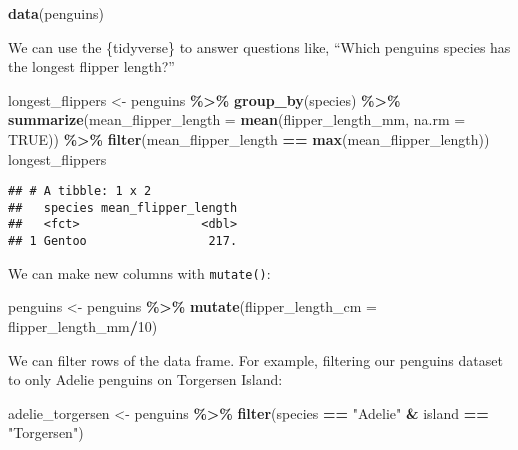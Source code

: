 \documentclass[
]{article}
\newenvironment{Shaded}{\begin{snugshade}}{\end{snugshade}}
\newcommand{\AttributeTok}[1]{\textcolor[rgb]{0.13,0.29,0.53}{#1}}
\newcommand{\ConstantTok}[1]{\textcolor[rgb]{0.56,0.35,0.01}{#1}}
\newcommand{\DecValTok}[1]{\textcolor[rgb]{0.00,0.00,0.81}{#1}}
\newcommand{\FunctionTok}[1]{\textcolor[rgb]{0.13,0.29,0.53}{\textbf{#1}}}
\newcommand{\NormalTok}[1]{#1}
\newcommand{\OtherTok}[1]{\textcolor[rgb]{0.56,0.35,0.01}{#1}}
\newcommand{\SpecialCharTok}[1]{\textcolor[rgb]{0.81,0.36,0.00}{\textbf{#1}}}
\newcommand{\StringTok}[1]{\textcolor[rgb]{0.31,0.60,0.02}{#1}}
\begin{document}
\begin{Shaded}
\begin{Highlighting}[]
\FunctionTok{data}\NormalTok{(penguins)}
\end{Highlighting}
\end{Shaded}

We can use the \{tidyverse\} to answer questions like, ``Which penguins
species has the longest flipper length?''

\begin{Shaded}
\begin{Highlighting}[]
\NormalTok{longest\_flippers }\OtherTok{\textless{}{-}}\NormalTok{ penguins }\SpecialCharTok{\%\textgreater{}\%}
  \FunctionTok{group\_by}\NormalTok{(species) }\SpecialCharTok{\%\textgreater{}\%}
  \FunctionTok{summarize}\NormalTok{(}\AttributeTok{mean\_flipper\_length =} \FunctionTok{mean}\NormalTok{(flipper\_length\_mm, }\AttributeTok{na.rm =} \ConstantTok{TRUE}\NormalTok{)) }\SpecialCharTok{\%\textgreater{}\%}
  \FunctionTok{filter}\NormalTok{(mean\_flipper\_length }\SpecialCharTok{==} \FunctionTok{max}\NormalTok{(mean\_flipper\_length))}
\NormalTok{longest\_flippers}
\end{Highlighting}
\end{Shaded}

\begin{verbatim}
## # A tibble: 1 x 2
##   species mean_flipper_length
##   <fct>                 <dbl>
## 1 Gentoo                 217.
\end{verbatim}

We can make new columns with \texttt{mutate()}:

\begin{Shaded}
\begin{Highlighting}[]
\NormalTok{penguins }\OtherTok{\textless{}{-}}\NormalTok{ penguins }\SpecialCharTok{\%\textgreater{}\%}
  \FunctionTok{mutate}\NormalTok{(}\AttributeTok{flipper\_length\_cm =}\NormalTok{ flipper\_length\_mm}\SpecialCharTok{/}\DecValTok{10}\NormalTok{)}
\end{Highlighting}
\end{Shaded}

We can filter rows of the data frame. For example, filtering our
penguins dataset to only Adelie penguins on Torgersen Island:

\begin{Shaded}
\begin{Highlighting}[]
\NormalTok{adelie\_torgersen }\OtherTok{\textless{}{-}}\NormalTok{ penguins }\SpecialCharTok{\%\textgreater{}\%}
  \FunctionTok{filter}\NormalTok{(species }\SpecialCharTok{==} \StringTok{"Adelie"} \SpecialCharTok{\&}\NormalTok{ island }\SpecialCharTok{==} \StringTok{"Torgersen"}\NormalTok{)}
\end{Highlighting}
\end{Shaded}
\end{document}
